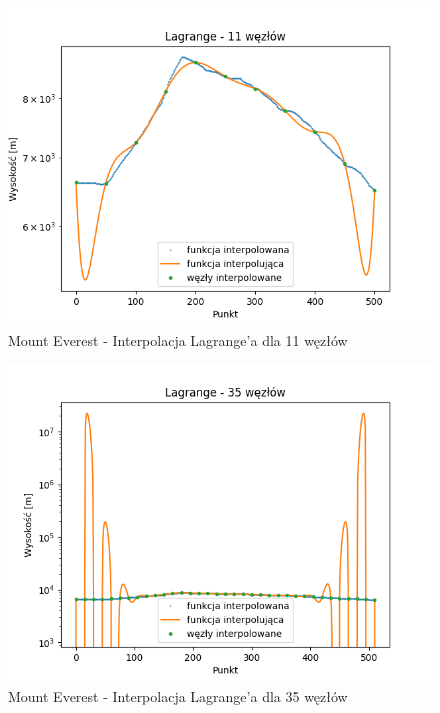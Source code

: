 \documentclass[12pt]{extarticle}
\begin{document}
\begin{figure}[H]
    \centering
    \includegraphics[scale=0.8]{interpolation_MountEverest_Lagrange_11.png}
    \caption{Mount Everest - Interpolacja Lagrange'a dla 11 węzłów}
\end{figure}
\begin{figure}[H]
    \centering
    \includegraphics[scale=0.8]{interpolation_MountEverest_Lagrange_35.png}
    \caption{Mount Everest - Interpolacja Lagrange'a dla 35 węzłów}
\end{figure}
\end{document}
